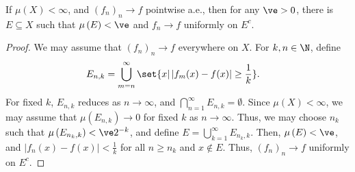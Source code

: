 \documentclass[10pt]{mypackage}
\begin{document}
\begin{theorem}
  If $\mu\left( X \right) < \infty$, and $\left( f_{n} \right)_n\rightarrow f$ pointwise a.e., then for any $\ve > 0$, there is $E\subseteq X$ such that $\mu\left( E \right) < \ve$ and $f_n\rightarrow f$ uniformly on $E^{c}$.
\end{theorem}
\begin{proof}
  We may assume that $\left( f_n \right)_n\rightarrow f$ everywhere on $X$. For $k,n\in\N$, define
  \begin{align*}
    E_{n,k} &= \bigcup_{m=n}^{\infty} \set{x | \left\vert f_m(x) - f(x) \right\vert \geq \frac{1}{k}}.
  \end{align*}
  For fixed $k$, $E_{n,k}$ reduces as $n\rightarrow\infty$, and $\bigcap_{n=1}^{\infty} E_{n,k} = \emptyset$. Since $\mu\left( X \right) < \infty$, we may assume that $\mu\left( E_{n,k} \right)\rightarrow 0$ for fixed $k$ as $n\rightarrow\infty$. Thus, we may choose $n_k$ such that $\mu\left( E_{n_k,k} \right) < \ve 2^{-k}$, and define $E = \bigcup_{k=1}^{\infty}E_{n_k,k}$. Then, $\mu\left( E \right) < \ve$, and $\left\vert f_n(x)-f(x) \right\vert < \frac{1}{k}$ for all $n\geq n_k$ and $x\notin E$. Thus, $\left( f_n \right)_n\rightarrow f$ uniformly on $E^{c}$.
\end{proof}
\end{document}
